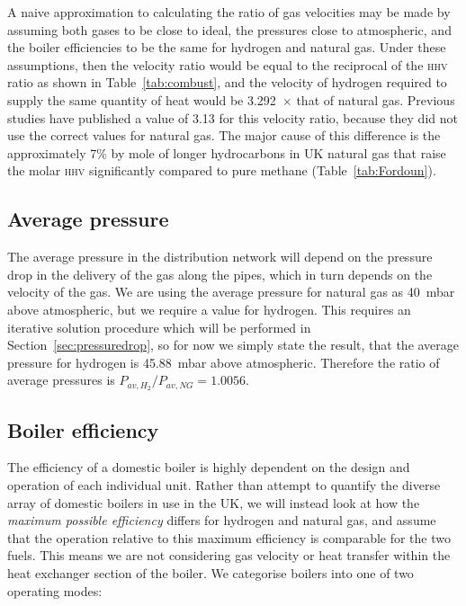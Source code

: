 \documentclass[5p]{elsarticle} %
\begin{document}
A naive approximation to calculating the ratio of gas velocities may be made by assuming both gases to be close to ideal, the pressures close to atmospheric, and the boiler efficiencies to be the same for hydrogen and natural gas.
Under these assumptions, then the velocity ratio would be equal to the reciprocal of the \textsc{hhv} ratio as shown in Table~\ref{tab:combust}, and the velocity of hydrogen required to supply the same quantity of heat would be 3.292~$\times$ that of natural gas. 
Previous studies have published a value of 3.13 for this velocity ratio, because they did not use the correct values for natural gas\citep{dodds2013,bossel2006}. 
The major cause of this difference is the approximately 7\% by mole of longer hydrocarbons in UK natural gas that raise the molar \textsc{hhv} significantly compared to pure methane (Table~\ref{tab:Fordoun}).

\subsection{Average pressure}
\label{sec:avpressure}

The average pressure in the distribution network will depend on the pressure drop in the delivery of the gas along the pipes, which in turn depends on the velocity of the gas.
We are using the average pressure for natural gas as 40~mbar above atmospheric\citep{utonomy23}, but we require a value for hydrogen. 
This requires an iterative solution procedure which will be performed in Section~\ref{sec:pressuredrop}, so for now we simply state the result, that the average pressure for hydrogen is 45.88~mbar above atmospheric.
Therefore the ratio of average pressures is ${P_{av,H_2}}/{P_{av,NG}} = 1.0056$.

\subsection{Boiler efficiency}
\label{sec:efficiency}

The efficiency of a domestic boiler is highly dependent on the design and operation of each individual unit. 
Rather than attempt to quantify the diverse array of domestic boilers  in use in the UK, we will instead look at how the \emph{maximum possible efficiency} differs for hydrogen and natural gas, and assume that the operation relative to this maximum efficiency is comparable for the two fuels.
This means we are not considering gas velocity or heat transfer within the heat exchanger section of the boiler.
We categorise boilers into one of two operating modes:
\end{document}
